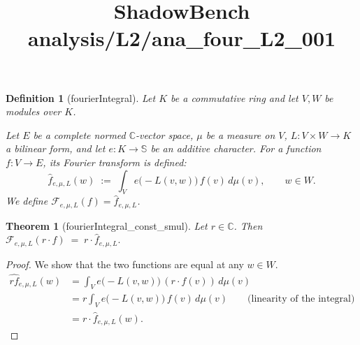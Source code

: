 \documentclass{article}
\title{ShadowBench analysis/L2/ana\_four\_L2\_001}
\newtheorem{theorem}{Theorem}
\newtheorem{definition}{Definition}
\begin{document}
\maketitle

\begin{definition}[fourierIntegral] Let $K$ be a commutative ring and let $V, W$ be modules over $K$. 

Let $E$ be a complete normed  $\mathbb{C}$-vector space, $\mu$ be a measure on $V$, $L : V \times W \to K$ a bilinear form, and let $e : K \to \mathbb{S}$ be an additive character.  
For a function $f : V \to E$, its Fourier transform is defined:
\[
\widehat{f}_{e,\mu,L}(w)
\;:=\;
\int_V e\!\bigl(-L(v,w)\bigr)\, f(v)\, d\mu(v),
\qquad w \in W.
\]
We define $\mathcal F_{e,\mu,L}(f) = \widehat{f}_{e,\mu,L}$.
\end{definition}


\begin{theorem}[fourierIntegral_const_smul]
Let $r \in \mathbb{C}$. Then $
\mathcal F_{e,\mu,L}(r \cdot f)
\;=\;
r \cdot \widehat{f}_{e,\mu,L}. $
\end{theorem}
\begin{proof}
    We show that the two functions are equal at any $w \in W$.
\[
\begin{aligned}
\hat{rf}_{e,\mu,L}(w)
&=
\int_V e\!\bigl(-L(v,w)\bigr)\, (r \cdot f(v))\, d\mu(v) \\
&=
r \int_V e\!\bigl(-L(v,w)\bigr)\, f(v)\, d\mu(v)
\qquad\text{(linearity of the integral)} \\
&=
r \cdot \widehat{f}_{e,\mu,L}(w).
\end{aligned}
\]
\end{proof}
\end{document}
